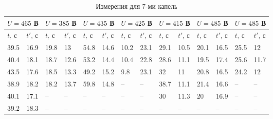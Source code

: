 \documentclass[a4paper,12pt]{article} %
\begin{document}
\begin{table}[h]
\centering
\begin{tabular}{|ll|ll|ll|ll|ll|ll|ll|}
\hline
\multicolumn{2}{|l|}{$U = 465$ В} & \multicolumn{2}{l|}{$U = 385$ В} & \multicolumn{2}{l|}{$U = 435$ В} & \multicolumn{2}{l|}{$U = 425$ В} & \multicolumn{2}{l|}{$U = 415$ В} & \multicolumn{2}{l|}{$U = 485$ В} & \multicolumn{2}{l|}{$U = 485$ В} \\ \hline
\multicolumn{1}{|l|}{$t$, с} & $t'$, с & \multicolumn{1}{l|}{$t$, с} & $t'$, с & \multicolumn{1}{l|}{$t$, с} & $t'$, с & \multicolumn{1}{l|}{$t$, с} & $t'$, с & \multicolumn{1}{l|}{$t$, с} & $t'$, с & \multicolumn{1}{l|}{$t$, с} & $t'$, с & \multicolumn{1}{l|}{$t$, с} & $t'$, с \\ \hline
\multicolumn{1}{|l|}{39.5} & 16.9 & \multicolumn{1}{l|}{19.8} & 13 & \multicolumn{1}{l|}{54.8} & 14.6 & \multicolumn{1}{l|}{10.2} & 23.1 & \multicolumn{1}{l|}{29.1} & 10.5 & \multicolumn{1}{l|}{20.1} & 16.5 & \multicolumn{1}{l|}{25.5} & 12 \\ \hline
\multicolumn{1}{|l|}{40.4} & 18.1 & \multicolumn{1}{l|}{18.7} & 12.6 & \multicolumn{1}{l|}{53.2} & 14.4 & \multicolumn{1}{l|}{10.4} & 22.8 & \multicolumn{1}{l|}{28.6} & 11.1 & \multicolumn{1}{l|}{19.5} & 17.4 & \multicolumn{1}{l|}{25.6} & 11.7 \\ \hline
\multicolumn{1}{|l|}{43.5} & 17.6 & \multicolumn{1}{l|}{18.5} & 13.3 & \multicolumn{1}{l|}{49.2} & 15.2 & \multicolumn{1}{l|}{9.8} & 23.1 & \multicolumn{1}{l|}{32} & 11 & \multicolumn{1}{l|}{20.8} & 16.5 & \multicolumn{1}{l|}{24.2} & 12 \\ \hline
\multicolumn{1}{|l|}{38.9} & 18.2 & \multicolumn{1}{l|}{18.2} & 13.7 & \multicolumn{1}{l|}{59.8} & 14.8 & \multicolumn{1}{l|}{--} & -- & \multicolumn{1}{l|}{38.7} & 11.1 & \multicolumn{1}{l|}{21.4} & 16.6 & \multicolumn{1}{l|}{--} & -- \\ \hline
\multicolumn{1}{|l|}{40.1} & 17.1 & \multicolumn{1}{l|}{--} & -- & \multicolumn{1}{l|}{--} & -- & \multicolumn{1}{l|}{--} & -- & \multicolumn{1}{l|}{30} & 11.3 & \multicolumn{1}{l|}{20} & 16.9 & \multicolumn{1}{l|}{--} & -- \\ \hline
\multicolumn{1}{|l|}{39.2} & 18.3 & \multicolumn{1}{l|}{--} & -- & \multicolumn{1}{l|}{--} & -- & \multicolumn{1}{l|}{--} & -- & \multicolumn{1}{l|}{--} & -- & \multicolumn{1}{l|}{--} & -- & \multicolumn{1}{l|}{--} & -- \\ \hline
\end{tabular}
\caption{Измерения для 7-ми капель}
\label{data}
\end{table}
\end{document}

